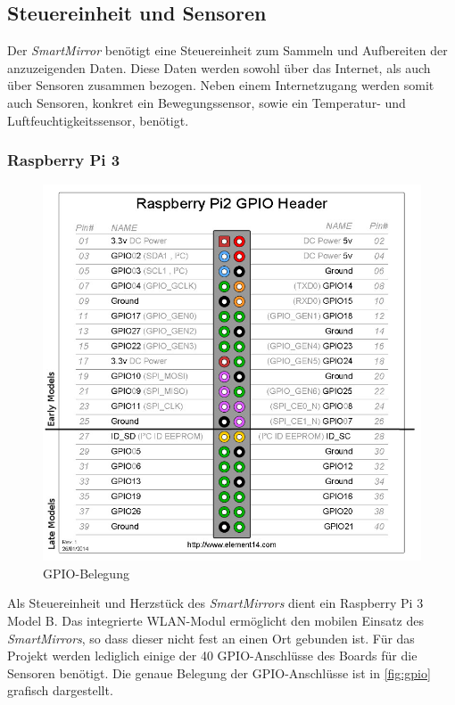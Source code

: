 \subsection{Steuereinheit und Sensoren}
Der \textit{SmartMirror} benötigt eine Steuereinheit zum Sammeln und Aufbereiten der anzuzeigenden Daten. Diese Daten werden sowohl über das Internet, als auch über Sensoren zusammen bezogen. Neben einem Internetzugang werden somit auch Sensoren, konkret ein Bewegungssensor, sowie ein Temperatur- und Luftfeuchtigkeitssensor, benötigt.

\subsubsection*{Raspberry Pi 3}
\begin{figure}[H]
	\includegraphics[scale=0.4]{bilder/gpio_pinout.jpg}
	\caption{GPIO-Belegung}
	\label{fig:gpio}
\end{figure}
Als Steuereinheit und Herzstück des \textit{SmartMirrors} dient ein Raspberry Pi 3 Model B. Das integrierte WLAN-Modul ermöglicht den mobilen Einsatz des \textit{SmartMirrors}, so dass dieser nicht fest an einen Ort gebunden ist. Für das Projekt werden lediglich einige der 40 GPIO-Anschlüsse des Boards für die Sensoren benötigt. Die genaue Belegung der GPIO-Anschlüsse ist in \autoref{fig:gpio} grafisch dargestellt.\cite{upton2013raspberry}

